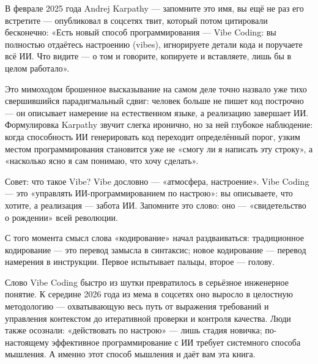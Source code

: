 


В феврале 2025 года Andrej Karpathy — запомните это имя, вы ещё не раз его встретите — опубликовал в соцсетях твит, который потом цитировали бесконечно: «Есть новый способ программирования — Vibe Coding: вы полностью отдаётесь настроению (vibes), игнорируете детали кода и поручаете всё ИИ. Что видите — о том и говорите, копируете и вставляете, лишь бы в целом работало».

Это мимоходом брошенное высказывание на самом деле точно назвало уже тихо свершившийся парадигмальный сдвиг: человек больше не пишет код построчно — он описывает намерение на естественном языке, а реализацию завершает ИИ. Формулировка Karpathy звучит слегка иронично, но за ней глубокое наблюдение: когда способность ИИ генерировать код переходит определённый порог, узким местом программирования становится уже не «смогу ли я написать эту строку», а «насколько ясно я сам понимаю, что хочу сделать».

\begin{tcbinfo}{Совет: что такое Vibe?}
Vibe дословно — «атмосфера, настроение». Vibe Coding — это «управлять ИИ-программированием по настрою»: вы описываете, что хотите, а реализация — забота ИИ. Запомните это слово: оно — «свидетельство о рождении» всей революции.

\end{tcbinfo}

С того момента смысл слова «кодирование» начал раздваиваться: традиционное кодирование — это перевод замысла в синтаксис; новое кодирование — перевод намерения в инструкции. Первое испытывает пальцы, второе — голову.

Слово Vibe Coding быстро из шутки превратилось в серьёзное инженерное понятие. К середине 2026 года из мема в соцсетях оно выросло в целостную методологию — охватывающую весь путь от выражения требований и управления контекстом до итеративной проверки и контроля качества. Люди также осознали: «действовать по настрою» — лишь стадия новичка; по-настоящему эффективное программирование с ИИ требует системного способа мышления. А именно этот способ мышления и даёт вам эта книга.

